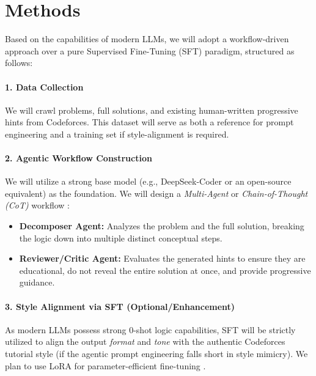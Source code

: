 \documentclass{article}
\begin{document}
\section{Methods}
Based on the capabilities of modern LLMs, we will adopt a workflow-driven approach over a pure Supervised Fine-Tuning (SFT) paradigm, structured as follows:

\paragraph{1. Data Collection} We will crawl problems, full solutions, and existing human-written progressive hints from Codeforces. This dataset will serve as both a reference for prompt engineering and a training set if style-alignment is required.

\paragraph{2. Agentic Workflow Construction} We will utilize a strong base model (e.g., DeepSeek-Coder or an open-source equivalent) as the foundation. We will design a \textit{Multi-Agent} or \textit{Chain-of-Thought (CoT)} workflow \cite{cot}:
\begin{itemize}
    \item \textbf{Decomposer Agent:} Analyzes the problem and the full solution, breaking the logic down into multiple distinct conceptual steps.
    \item \textbf{Reviewer/Critic Agent:} Evaluates the generated hints to ensure they are educational, do not reveal the entire solution at once, and provide progressive guidance.
\end{itemize}

\paragraph{3. Style Alignment via SFT (Optional/Enhancement)} As modern LLMs possess strong 0-shot logic capabilities, SFT will be strictly utilized to align the output \textit{format} and \textit{tone} with the authentic Codeforces tutorial style (if the agentic prompt engineering falls short in style mimicry). We plan to use LoRA for parameter-efficient fine-tuning \cite{hu2021lora}.
\end{document}
